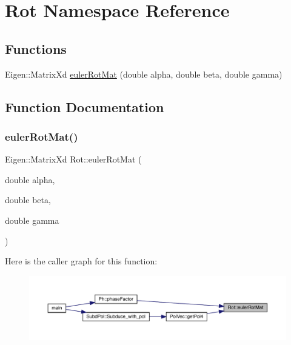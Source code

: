 \hypertarget{namespaceRot}{}\section{Rot Namespace Reference}
\label{namespaceRot}
\subsection*{Functions}
\begin{DoxyCompactItemize}
\item 
Eigen\+::\+Matrix\+Xd \mbox{\hyperlink{namespaceRot_adcd0cec8d1616e5f74d30cb3ad1aca99}{euler\+Rot\+Mat}} (double alpha, double beta, double gamma)
\end{DoxyCompactItemize}


\subsection{Function Documentation}
\mbox{\label{namespaceRot_adcd0cec8d1616e5f74d30cb3ad1aca99}} 
\subsubsection{\texorpdfstring{eulerRotMat()}{eulerRotMat()}}
{\footnotesize\ttfamily Eigen\+::\+Matrix\+Xd Rot\+::euler\+Rot\+Mat (\begin{DoxyParamCaption}\item[{double}]{alpha,  }\item[{double}]{beta,  }\item[{double}]{gamma }\end{DoxyParamCaption})}

Here is the caller graph for this function\+:\nopagebreak
\begin{figure}[H]
\begin{center}
\leavevmode
\includegraphics[width=350pt]{d7/dcc/namespaceRot_adcd0cec8d1616e5f74d30cb3ad1aca99_icgraph}
\end{center}
\end{figure}
